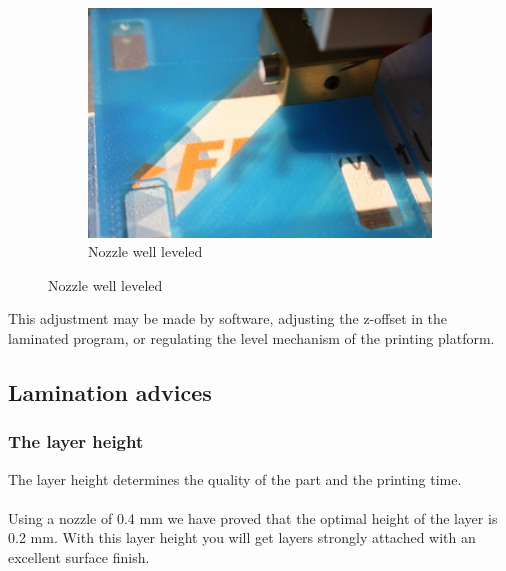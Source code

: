 \documentclass[11pt,a4paper]{article}
\begin{document}
\begin{figure}[H]
\begin{subfigure}[b]{0.3\textwidth}
        \includegraphics[width=\textwidth,cfbox=azul_marcos 3pt 0pt]{FOTOS/HOTENDPERFECTO}
	\caption*{Nozzle well leveled}
    \end{subfigure}
\end{figure}
This adjustment may be made by software, adjusting the z-offset in the laminated program, or regulating the level mechanism of the printing platform.
	\subsection{Lamination advices}
		\subsubsection{The layer height}
The layer height determines the quality of the part and the printing time.
\\\\
Using a nozzle of 0.4 mm we have proved that the optimal height of the layer is 0.2 mm. With this layer height you will get layers strongly attached with an excellent surface finish.
\end{document}
